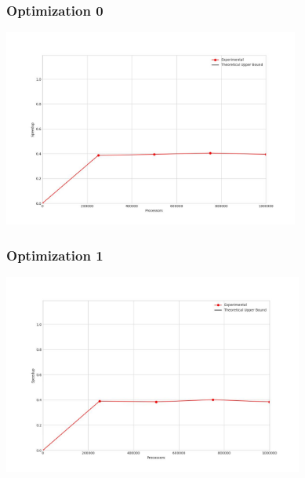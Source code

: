 \subsubsection{Optimization 0}
\begin{center}
    \resizebox{0.8\textwidth}{!}{}
    \includegraphics[width=0.73\textwidth]{../img/speedup-graph_type-fully-disconnected-1000000-O0}
\end{center}

\subsubsection{Optimization 1}
\begin{center}
    \resizebox{0.8\textwidth}{!}{}
    \includegraphics[width=0.74\textwidth]{../img/speedup-graph_type-fully-disconnected-1000000-O1}
\end{center}

\clearpage
